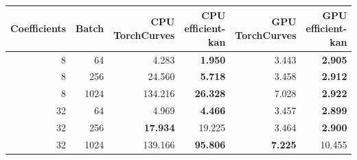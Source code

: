 \begin{tabular}{rrrrrr}
\hline
Coefficients & Batch & CPU TorchCurves & CPU efficient-kan & GPU TorchCurves & GPU efficient-kan \\
\hline
8 & 64 & 4.283 & \textbf{1.950} & 3.443 & \textbf{2.905} \\
8 & 256 & 24.560 & \textbf{5.718} & 3.458 & \textbf{2.912} \\
8 & 1024 & 134.216 & \textbf{26.328} & 7.028 & \textbf{2.922} \\
32 & 64 & 4.969 & \textbf{4.466} & 3.457 & \textbf{2.899} \\
32 & 256 & \textbf{17.934} & 19.225 & 3.464 & \textbf{2.900} \\
32 & 1024 & 139.166 & \textbf{95.806} & \textbf{7.225} & 10.455 \\
\hline
\end{tabular}

